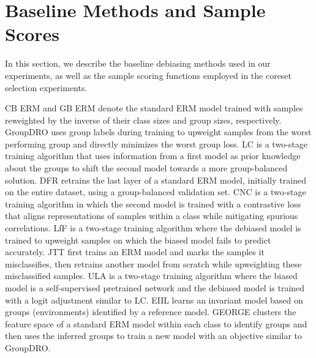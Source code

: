 \documentclass[letter,11pt]{article}
\begin{document}
\section{Baseline Methods and Sample Scores}\label{sec:app_info_baseline}
In this section, we describe the baseline debiasing methods used in our experiments, as well as the sample scoring functions employed in the coreset selection experiments.

CB ERM and GB ERM denote the standard ERM model trained with samples reweighted by the inverse of their class sizes and group sizes, respectively. GroupDRO \citep{GroupDRO} uses group labels during training to upweight samples from the worst performing group and directly minimizes the worst group loss. LC \citep{LC} is a two-stage training algorithm that uses information from a first model as prior knowledge about the groups to shift the second model towards a more group-balanced solution. DFR \citep{DFR} retrains the last layer of a standard ERM model, initially trained on the entire dataset, using a group-balanced validation set. CNC \citep{CNC} is a two-stage training algorithm in which the second model is trained with a contrastive loss that aligns representations of samples within a class while mitigating spurious correlations. LfF \citep{LFF} is a two-stage training algorithm where the debiased model is trained to upweight samples on which the biased model fails to predict accurately. JTT \citep{JTT} first trains an ERM model and marks the samples it misclassifies, then retrains another model from scratch while upweighting these misclassified samples. ULA \citep{uLA} is a two-stage training algorithm where the biased model is a self-supervised pretrained network and the debiased model is trained with a logit adjustment similar to LC. EIIL \citep{EIIL} learns an invariant model based on groups (environments) identified by a reference model. GEORGE \citep{GEORGE} clusters the feature space of a standard ERM model within each class to identify groups and then uses the inferred groups to train a new model with an objective similar to GroupDRO.
\end{document}
